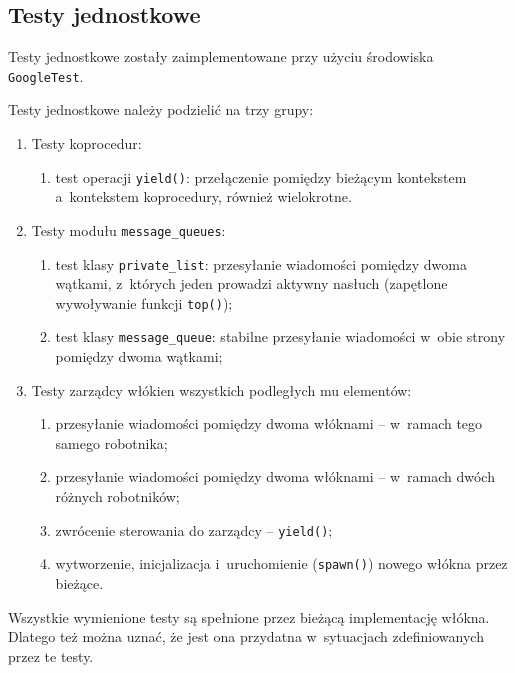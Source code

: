 \documentclass[12pt]{mwart}
\newcommand{\code}{\texttt}
\newcommand{\procbr}{()}
\newcommand{\function}[1]{\code{#1\procbr}}
\begin{document}
\subsection{Testy jednostkowe}
\indent
  Testy jednostkowe zostały zaimplementowane przy użyciu \linebreak środowiska \code{GoogleTest}.
\par
\indent
  Testy jednostkowe należy podzielić na trzy grupy:
  \begin{enumerate}
    \item Testy koprocedur:
      \begin{enumerate}
        \item test operacji \function{yield}: przełączenie pomiędzy bieżącym kontekstem a~kontekstem koprocedury, również wielokrotne.
      \end{enumerate}
    \item Testy modułu \code{message\_queues}:
      \begin{enumerate}
        \item test klasy \code{private\_list}: przesyłanie wiadomości pomiędzy dwoma wątkami, z~których jeden prowadzi aktywny nasłuch (zapętlone wywoływanie
          funkcji \function{top});
        \item test klasy \code{message\_queue}: stabilne przesyłanie wiadomości w~obie strony pomiędzy dwoma wątkami;
      \end{enumerate}
    \item Testy zarządcy włókien wszystkich podległych mu elementów:
      \begin{enumerate}
        \item przesyłanie wiadomości pomiędzy dwoma włóknami -- w~ramach tego samego robotnika;
        \item przesyłanie wiadomości pomiędzy dwoma włóknami -- w~ramach dwóch różnych robotników;
        \item zwrócenie sterowania do zarządcy -- \function{yield};
        \item wytworzenie, inicjalizacja i~uruchomienie (\function{spawn}) nowego włókna przez bieżące.
      \end{enumerate}
  \end{enumerate}
  Wszystkie wymienione testy są spełnione przez bieżącą implementację włókna. Dlatego też można uznać, że jest ona przydatna w~sytuacjach zdefiniowanych
  przez te testy.
\par
\end{document}
